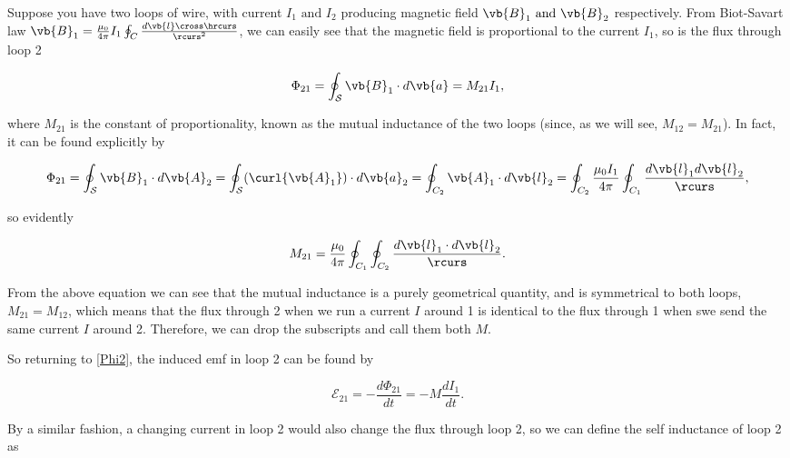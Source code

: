 \documentclass[english,a4paper,12pt]{report}
\begin{document}
Suppose you have two loops of wire, with current \(I_1 \text { and } I_2 \) producing magnetic field \(\vb{B} _{1} \text { and } \vb{B} _{2}\) respectively. From Biot-Savart law \(\vb{B} _{1} = \frac{\mu _{0} }{4\pi } I_1 \oint_{C}\frac{d \vb{l} \cross \hrcurs }{\rcurs ^2 }   \), we can easily see that the magnetic field is proportional to the current \(I_1 \), so is the flux through loop 2 

\begin{equation} \label{Phi2} 
    \Phi _{21} = \oint_{\mathcal{S}} \vb{B} _{1} \cdot d\vb{a} = M_{21} I_1 ,    
\end{equation}

where \(M_{21} \) is the constant of proportionality, known as the mutual inductance of the two loops (since, as we will see, \(M_{12} = M_{21}  \)). In fact, it can be found explicitly by

\begin{equation}
    \Phi _{21} = \oint_{\mathcal{S}} \vb{B} _{1} \cdot d \vb{A} _{2} = \oint_{\mathcal{S}} (\curl{\vb{A} _{1} }  ) \cdot d\vb{a} _{2} = \oint_{C_2 } \vb{A} _{1} \cdot d \vb{l} _{2} = \oint_{C_2 } \frac{\mu _{0} I_1  }{4\pi }\oint_{C_1 } \frac{d \vb{l} _{1} d \vb{l} _{2}  }{\rcurs },            
\end{equation}

so evidently

\begin{equation}
    M_{21} = \frac{\mu _{0} }{4 \pi } \oint_{C_1 }\oint_{C_2 } \frac{d \vb{l} _{1} \cdot d \vb{l} _{2} }{\rcurs }.     
\end{equation}

From the above equation we can see that the mutual inductance is a purely geometrical quantity, and is symmetrical to both loops, \ie \(M_{21} = M_{12}  \), which means that the flux through 2 when we run a current \(I\) around 1 is identical to the flux through 1 when swe send the same current \(I\) around 2. Therefore, we can drop the subscripts and call them both \(M\).

So returning to \cref{Phi2}, the induced emf in loop 2 can be found by 

\begin{equation}
    \mathcal{E}_{21} = - \frac{d\Phi _{21} }{dt} = - M \frac{dI_1 }{dt}.  
\end{equation}

By a similar fashion, a changing current in loop 2 would also change the flux through loop 2, so we can define the self inductance of loop 2 as 
\end{document}
